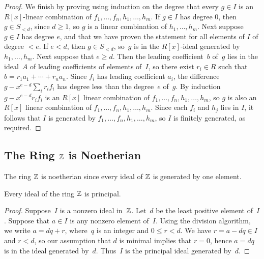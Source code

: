 \begin{proof}
We finish by proving using induction on the degree that every $g\in I$ is an
$R[x]$-linear combination of $f_1,\ldots, f_n, h_1,\ldots, h_m$.
If $g\in I$ has degree $0$, then $g \in S_{<d}$, since $d\geq 1$, so
$g$ is a linear combination of $h_1,\ldots, h_m$.  Next suppose
$g\in I$ has degree $e$, and that we have proven the statement
for all elements of $I$ of degree $<e$.
If $e < d$, then $g\in S_{<d}$, so~$g$ is
in the $R[x]$-ideal generated by $h_1,\ldots, h_m$.  Next suppose
that $e\geq d$.  Then the leading coefficient~$b$
of~$g$ lies in the ideal~$A$ of leading coefficients of elements of~$I$, so there
exist $r_i\in R$ such that $b=r_1 a_1 + \cdots + r_n a_n$.  Since
$f_i$ has leading coefficient $a_i$, the difference $g- x^{e-d} \sum_i r_i
f_i$ has degree less than the degree~$e$ of~$g$.  By induction $g-
x^{e-d} r_i f_i$ is an $R[x]$ linear combination of $f_1,\ldots, f_n,
h_1,\ldots, h_m$, so $g$ is also an $R[x]$ linear combination of
$f_1,\ldots, f_n, h_1,\ldots, h_m$.  Since each $f_i$ and $h_j$ lies in
$I$, it follows that $I$ is generated by $f_1,\ldots, f_n, h_1,\ldots,
h_m$, so $I$ is finitely generated, as required.
\end{proof}

\subsection{The Ring $\mathbb{Z}$ is Noetherian}\label{sec:Znoeth}

The ring $\mathbb{Z}$ is noetherian since every ideal of $\mathbb{Z}$ is
generated by one element.
\begin{proposition}\label{prop:zpid}
	Every ideal of the ring $\mathbb{Z}$ is principal.
\end{proposition}
\begin{proof}
	Suppose~$I$ is a nonzero ideal in~$\mathbb{Z}$. Let~$d$ be the least positive
	element of~$I$.  Suppose that $a\in I$ is any nonzero element of~$I$.
	Using the division algorithm, we write $a=dq + r$, where~$q$ is an
	integer and $0\leq r < d$.  We have $r=a-dq\in I$ and $r<d$, so our
	assumption that $d$ is minimal implies that $r=0$, hence $a=dq$ is in
	the ideal generated by~$d$. Thus~$I$ is the principal ideal generated
	by~$d$.
\end{proof}

